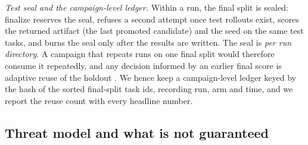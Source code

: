 \emph{Test seal and the campaign-level ledger.}
Within a run, the final split is sealed: finalize reserves the seal, refuses a second attempt once test rollouts exist,
scores the returned artifact (the last promoted candidate) and the seed on the same test tasks, and burns the seal only after the results are written.
The seal is \emph{per run directory}. A campaign that repeats runs on one final split would therefore consume it
repeatedly, and any decision informed by an earlier final score is adaptive reuse of the holdout
\citep{adaptive-data-analysis-holdout-reuse}. We hence keep a campaign-level ledger keyed by the hash of the sorted
final-split task ids, recording run, arm and time, and we report the reuse count with every headline number.

\subsection{Threat model and what is not guaranteed}
\label{sec:method:threat}

